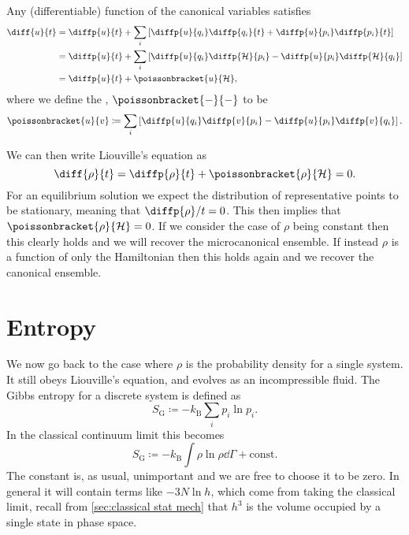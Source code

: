 \documentclass[fleqn]{NotesClass}
\newcommand*{\boltzmann}{k_{\mathrm{B}}}
\newcommand*{\hamiltonian}{\mathcal{H}}
\begin{document}
    Any (differentiable) function of the canonical variables satisfies
    \begin{align}
        \diff{u}{t} &= \diffp{u}{t} + \sum_{i}\left[ \diffp{u}{q_i}\diffp{q_i}{t} + \diffp{u}{p_i}\diffp{p_i}{t} \right]\\
        &= \diffp{u}{t} + \sum_{i}\left[ \diffp{u}{q_i}\diffp{\hamiltonian}{p_i} - \diffp{u}{p_i}\diffp{\hamiltonian}{q_i} \right]\\
        &= \diffp{u}{t} + \poissonbracket{u}{\hamiltonian},
    \end{align}
    where we define the , \(\poissonbracket{-}{-}\) to be
    \begin{equation}
        \poissonbracket{u}{v} \coloneqq \sum_i\left[ \diffp{u}{q_i}\diffp{v}{p_i} - \diffp{u}{p_i}\diffp{v}{q_i} \right].
    \end{equation}
    
    We can then write Liouville's equation as
    \begin{equation}
        \diff{\rho}{t} = \diffp{\rho}{t} + \poissonbracket{\rho}{\hamiltonian} = 0.
    \end{equation}
    For an equilibrium solution we expect the distribution of representative points to be stationary, meaning that \(\diffp{\rho}/{t} = 0\).
    This then implies that \(\poissonbracket{\rho}{\hamiltonian} = 0\).
    If we consider the case of \(\rho\) being constant then this clearly holds and we will recover the microcanonical ensemble.
    If instead \(\rho\) is a function of only the Hamiltonian then this holds again and we recover the canonical ensemble.
    
    \section{Entropy}
    We now go back to the case where \(\rho\) is the probability density for a single system.
    It still obeys Liouville's equation, and evolves as an incompressible fluid.
    The Gibbs entropy for a discrete system is defined as
    \begin{equation}
        S_{\mathrm{G}} \coloneqq -\boltzmann\sum_{i} p_i \ln p_i.
    \end{equation}
    In the classical continuum limit this becomes
    \begin{equation}
        S_{\mathrm{G}} \coloneqq -\boltzmann\int \rho\ln\rho \dd{\Gamma} + \mathrm{const}.
    \end{equation}
    The constant is, as usual, unimportant and we are free to choose it to be zero.
    In general it will contain terms like \(-3N\ln h\), which come from taking the classical limit, recall from \cref{sec:classical stat mech} that \(h^{3}\) is the volume occupied by a single state in phase space.
    
\end{document}
